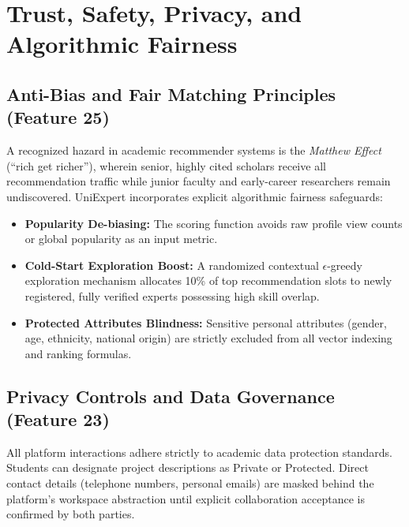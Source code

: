 \documentclass[11pt,a4paper]{article}
\begin{document}
\section[Trust, Safety \& Fairness]{Trust, Safety, Privacy, and Algorithmic Fairness}

\subsection{Anti-Bias and Fair Matching Principles (Feature 25)}
A recognized hazard in academic recommender systems is the \textit{Matthew Effect} (``rich get richer''), wherein senior, highly cited scholars receive all recommendation traffic while junior faculty and early-career researchers remain undiscovered. UniExpert incorporates explicit algorithmic fairness safeguards:
\begin{itemize}
    \item \textbf{Popularity De-biasing:} The scoring function avoids raw profile view counts or global popularity as an input metric.
    \item \textbf{Cold-Start Exploration Boost:} A randomized contextual $\epsilon$-greedy exploration mechanism allocates 10\% of top recommendation slots to newly registered, fully verified experts possessing high skill overlap.
    \item \textbf{Protected Attributes Blindness:} Sensitive personal attributes (gender, age, ethnicity, national origin) are strictly excluded from all vector indexing and ranking formulas.
\end{itemize}

\subsection{Privacy Controls and Data Governance (Feature 23)}
All platform interactions adhere strictly to academic data protection standards. Students can designate project descriptions as Private or Protected. Direct contact details (telephone numbers, personal emails) are masked behind the platform's workspace abstraction until explicit collaboration acceptance is confirmed by both parties.

\clearpage
\end{document}
